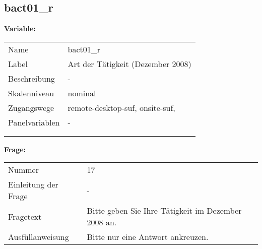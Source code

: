 	
	
	\subsection{bact01\_r}
	\label{subSection:bact01_r}

	\noindent\textbf{Variable:}\\
		\begin{tabular}{lL{11.3cm}}
			\label{tableVariable:bact01_r}
			Name & bact01\_r \\
			Label & Art der Tätigkeit (Dezember 2008) \\
			Beschreibung & - \\
			Skalenniveau & nominal \\
			Zugangswege &
				remote-desktop-suf,
				onsite-suf,
 \\
			Panelvariablen & -
			 \\
			 \\
 \\
		\end{tabular}

		\vspace*{1 cm}
		\noindent\textbf{Frage:}\\
		\begin{tabular}{lL{11.3cm}}
			\label{tableQuestion:bact01_r}
			Nummer & 17 \\
			Einleitung der Frage & - \\
			Fragetext & Bitte geben Sie Ihre Tätigkeit im Dezember 2008 an. \\
			Ausfüllanweisung & Bitte nur eine Antwort ankreuzen. \\
		\end{tabular}





